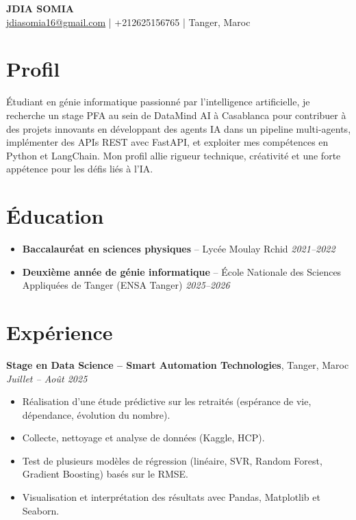 \documentclass[a4paper,11pt]{article}
\begin{document}
\begin{center}
    {\Huge \textbf{JDIA SOMIA}} \\[6pt]
    \href{mailto:jdiasomia16@gmail.com}{jdiasomia16@gmail.com} \quad|\quad
    +212625156765 \quad|\quad
    Tanger, Maroc
\end{center}

\vspace{6pt}

\section*{Profil}
Étudiant en génie informatique passionné par l'intelligence artificielle, je recherche un stage PFA au sein de DataMind AI à Casablanca pour contribuer à des projets innovants en développant des agents IA dans un pipeline multi-agents, implémenter des APIs REST avec FastAPI, et exploiter mes compétences en Python et LangChain. Mon profil allie rigueur technique, créativité et une forte appétence pour les défis liés à l'IA.

\section*{Éducation}
\begin{itemize}[leftmargin=*, noitemsep]
    \item \textbf{Baccalauréat en sciences physiques} – Lycée Moulay Rchid \hfill \textit{2021–2022}
    \item \textbf{Deuxième année de génie informatique} – École Nationale des Sciences Appliquées de Tanger (ENSA Tanger) \hfill \textit{2025–2026}
\end{itemize}

\section*{Expérience}

\textbf{Stage en Data Science – Smart Automation Technologies}, Tanger, Maroc \hfill \textit{Juillet – Août 2025}
\begin{itemize}[leftmargin=*, noitemsep]
    \item Réalisation d'une étude prédictive sur les retraités (espérance de vie, dépendance, évolution du nombre).
    \item Collecte, nettoyage et analyse de données (Kaggle, HCP).
    \item Test de plusieurs modèles de régression (linéaire, SVR, Random Forest, Gradient Boosting) basés sur le RMSE.
    \item Visualisation et interprétation des résultats avec Pandas, Matplotlib et Seaborn.
\end{itemize}
\end{document}
